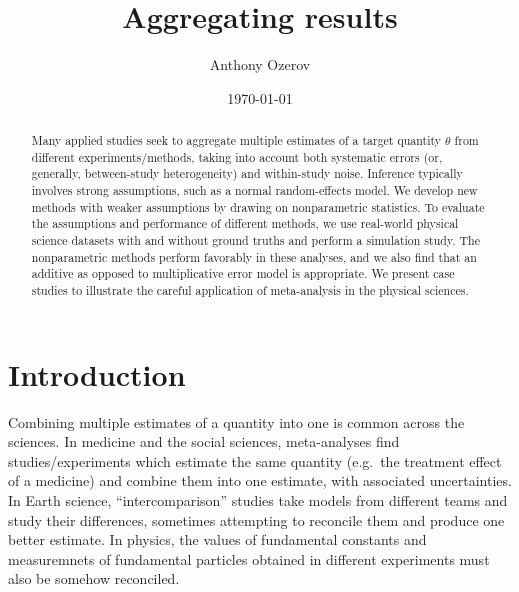 \documentclass[letterpaper,12pt]{article}
\title{Aggregating results}
\author{Anthony Ozerov}
\date{\today}
\begin{document}
\maketitle

\begin{abstract}
\noindent Many applied studies seek to aggregate multiple estimates of a target quantity $\theta$ from different experiments/methods, taking into account both systematic errors (or, generally, between-study heterogeneity) and within-study noise. Inference typically involves strong assumptions, such as a normal random-effects model. We develop new methods with weaker assumptions by drawing on nonparametric statistics. To evaluate the assumptions and performance of different methods, we use real-world physical science datasets with and without ground truths and perform a simulation study. The nonparametric methods perform favorably in these analyses, and we also find that an additive as opposed to multiplicative error model is appropriate. We present case studies to illustrate the careful application of meta-analysis in the physical sciences.
\end{abstract}

\newpage

\tableofcontents

\newpage

\section{Introduction}\label{introduction}

Combining multiple estimates of a quantity into one is common across the sciences. In medicine and the social sciences, meta-analyses find studies/experiments which estimate the same quantity (e.g.~the treatment effect of a medicine) and combine them into one estimate, with associated uncertainties. In Earth science, ``intercomparison'' studies take models from different teams and study their differences, sometimes attempting to reconcile them and produce one better estimate. In physics, the values of fundamental constants and measuremnets of fundamental particles obtained in different experiments must also be somehow reconciled.
\end{document}
